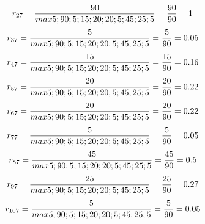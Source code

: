 \documentclass[a4paper,twoside]{article}
\begin{document}
\begin{enumerate}
\begin{enumerate}
\begin{displaymath}
r_{27} = \frac{90}{max {5;90;5;15;20;20;5;45;25;5}} = \frac{90}{90} = 1\\
\end{displaymath}
\begin{displaymath}
r_{37} = \frac{5}{max {5;90;5;15;20;20;5;45;25;5}} = \frac{5}{90} = 0.05\\
\end {displaymath}
\begin{displaymath}
r_{47} = \frac{15}{max {5;90;5;15;20;20;5;45;25;5}} = \frac{15}{90} = 0.16\\
\end {displaymath}
\begin{displaymath}
r_{57} = \frac{20}{max {5;90;5;15;20;20;5;45;25;5}} = \frac{20}{90} = 0.22\\
\end {displaymath}
\begin{displaymath}
r_{67} = \frac{20}{max {5;90;5;15;20;20;5;45;25;5}} = \frac{20}{90} = 0.22\\
\end {displaymath}
\begin{displaymath}
r_{77} = \frac{5}{max {5;90;5;15;20;20;5;45;25;5}} = \frac{5}{90} = 0.05\\
\end {displaymath}
\begin{displaymath}
r_{87} = \frac{45}{max {5;90;5;15;20;20;5;45;25;5}} = \frac{45}{90} = 0.5\\
\end {displaymath}
\begin{displaymath}
r_{97} = \frac{25}{max {5;90;5;15;20;20;5;45;25;5}} = \frac{25}{90} = 0.27\\
\end {displaymath}
\begin{displaymath}
r_{107} = \frac{5}{max {5;90;5;15;20;20;5;45;25;5}} = \frac{5}{90} = 0.05\\
\end {displaymath}
\end{enumerate}


\end{enumerate}
\end{document}
